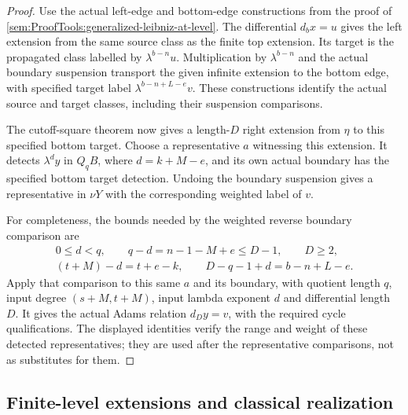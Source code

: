 \begin{proof}
Use the actual left-edge and bottom-edge constructions from the
proof of \ref{sem:ProofTools:generalized-leibniz-at-level}. The
differential $d_bx=u$ gives the left extension from the same source
class as the finite top extension. Its target is the propagated
class labelled by $\lambda^{b-n}u$. Multiplication by
$\lambda^{b-n}$ and the actual boundary suspension transport the
given infinite extension to the bottom edge, with specified target
label $\lambda^{b-n+L-e}v$. These constructions identify the actual
source and target classes, including their suspension comparisons.

The cutoff-square theorem now gives a length-$D$ right extension
from $\eta$ to this specified bottom target. Choose a representative
$a$ witnessing this extension. It detects $\lambda^d y$ in $Q_qB$,
where $d=k+M-e$, and its own actual boundary has the specified
bottom target detection. Undoing the boundary suspension gives a
representative in $\nu Y$ with the corresponding weighted label
of $v$.

For completeness, the bounds needed by the weighted reverse
boundary comparison are
\[
\begin{gathered}
0\le d<q,\qquad
q-d=n-1-M+e\le D-1,\qquad D\ge2,\\
(t+M)-d=t+e-k,\qquad
D-q-1+d=b-n+L-e.
\end{gathered}
\]
Apply that comparison to this same $a$ and its boundary, with quotient
length $q$, input degree $(s+M,t+M)$, input lambda exponent $d$ and
differential length $D$. It gives the actual Adams relation
$d_Dy=v$, with the required cycle qualifications. The displayed
identities verify the range and weight of these detected
representatives; they are used after the representative comparisons,
not as substitutes for them.
\end{proof}

\subsection{Finite-level extensions and classical realization}

